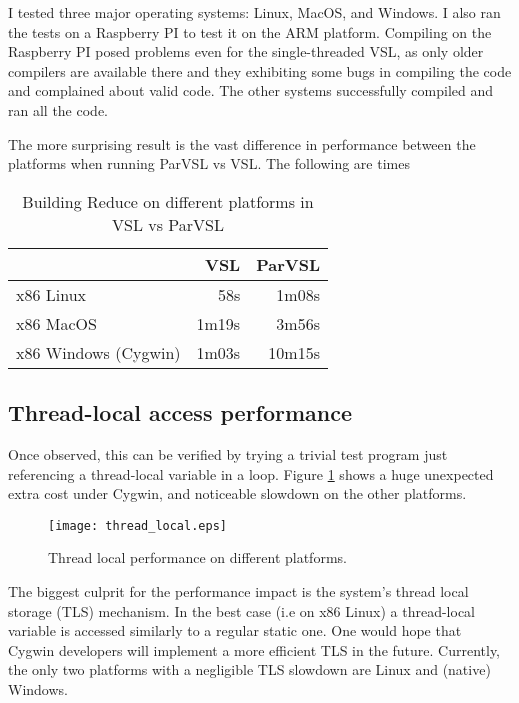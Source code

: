 I tested three major operating systems: Linux, MacOS, and Windows. I also
ran the tests on a Raspberry PI to test it on the ARM platform. Compiling on the Raspberry PI
posed problems even for the single-threaded VSL, as only older compilers are available
there and they exhibiting some bugs in compiling the code and complained about valid code.
The other systems successfully compiled and ran all the code.

The more surprising result is the vast difference in performance between the platforms
when running ParVSL vs VSL. The following are times

\begin{table}
  \centering
  \begin{tabular}{lrr}
                       & VSL    & ParVSL \\
  \hline
  x86 Linux            &   58s &  1m08s \\
  x86 MacOS            & 1m19s &  3m56s  \\
  x86 Windows (Cygwin) & 1m03s & 10m15s \\
  \end{tabular}
  \caption{Building Reduce on different platforms in VSL vs ParVSL}
  \label{table:cross-platform-reduce}
\end{table}


\subsection{Thread-local access performance}

Once observed, this can be verified by trying a trivial test program just referencing a
thread-local variable in a loop. Figure \ref{fig:threadlocal}
shows a huge unexpected extra cost under Cygwin, and noticeable slowdown on the other platforms.

\begin{figure}[H]
\centering
\texttt{[image: thread\_local.eps]}
\caption{Thread local performance on different platforms.}
\label{fig:threadlocal}
\end{figure}

The biggest culprit for the performance impact is the system's thread local storage (TLS)
mechanism. In the best case (i.e on x86 Linux) a thread-local variable is accessed
similarly to a regular static one. One would hope that Cygwin developers will
implement a more efficient TLS in the future. Currently, the only two platforms
with a negligible TLS slowdown are Linux and (native) Windows.